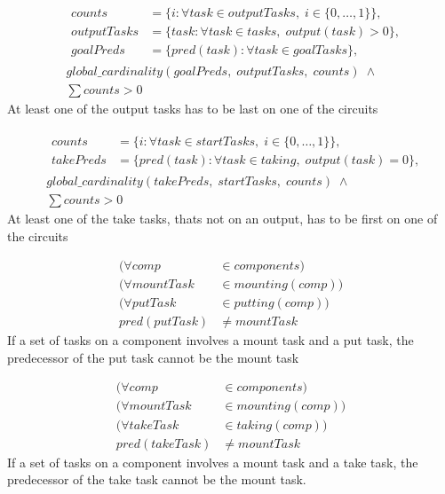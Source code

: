 \documentclass[10pt,a4paper]{report}
\begin{document}
\begin{equation}
\begin{aligned}\label{eq:82}
&\begin{aligned}
counts &= \{i : \forall task \in outputTasks, \; i \in \{0 , \ldots , 1\}\}, \\
outputTasks &= \{task : \forall task \in tasks, \; output(task) > 0\}, \\
goalPreds &= \{pred(task) : \forall task \in goalTasks\},
\end{aligned} \\
&global\_cardinality(goalPreds, \; outputTasks, \; counts) \; \land\\
&\sum counts > 0
\end{aligned}
\end{equation}
At least one of the output tasks has to be last on one of the circuits


\begin{equation}
\begin{aligned}\label{eq:83}
&\begin{aligned}
counts &= \{i : \forall task \in startTasks, \; i \in \{0 , \ldots , 1\}\}, \\
takePreds &= \{pred(task) : \forall task \in taking, \; output(task) = 0\}, 
\end{aligned}\\
&global\_cardinality(takePreds, \; startTasks, \; counts) \; \land\\
&\sum counts > 0
\end{aligned}
\end{equation}
At least one of the take tasks, thats not on an output, has to be first on one of the circuits


\begin{equation}
\begin{aligned}\label{eq:84}
(\forall comp &\in components) \\
(\forall mountTask &\in mounting(comp)) \\
(\forall putTask &\in putting(comp)) \\
pred(putTask) &\neq mountTask
\end{aligned}
\end{equation}
If a set of tasks on a component involves a mount task and a put task, the predecessor of the put task cannot be the mount task


\begin{equation}
\begin{aligned}\label{eq:85}
(\forall comp &\in components) \\
(\forall mountTask &\in mounting(comp)) \\
(\forall takeTask &\in taking(comp)) \\
pred(takeTask) &\neq mountTask
\end{aligned}
\end{equation}
If a set of tasks on a component involves a mount task and a take task, the predecessor of the take task cannot be the mount task.
\end{document}
